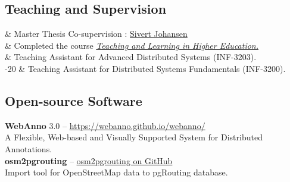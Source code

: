 \documentclass[11pt, a4paper]{article}
\newcommand{\LastName}{Sharma}
\newcommand{\Initials}{A}
\newcommand{\Me}{\textbf{\LastName, \Initials}}  %
\newcommand{\DOI}[1]{doi:\href{https://doi.org/#1}{#1}}
\newcommand{\Year}[1]{\fontsize{10pt}{0}\selectfont #1}
\begin{document}
\iffalse

\subsection*{Open Datasets}

\begin{EntriesTable}
\Year{2017}  &
    \Me, \Val.
    A gravity-derived Moho model for South America: source code, data, and
    model results from ``Fast non-linear gravity inversion in spherical
    coordinates with application to the South American Moho''.
    \DOI{10.6084/m9.figshare.3987267}
\end{EntriesTable}

\fi



\subsection*{Teaching and Supervision}

\begin{EntriesTable}
	\Year{2021} &
	Master Thesis Co-supervision : \href{https://munin.uit.no/handle/10037/25929}{Sivert Johansen} 
	\\
	\Year{2020} & 
	Completed the course \href{https://result.uit.no/phd-course/}{\textit{Teaching and Learning in Higher Education.}} 
	\\
	\Year{2020} &
	Teaching Assistant for Advanced Distributed Systems (INF-3203).
	\\
	\Year{2019-20} &
	Teaching Assistant for Distributed Systems Fundamentals (INF-3200).

\end{EntriesTable}

\subsection*{Open-source Software}
\textbf{WebAnno} 3.0 -- \href{https://webanno.github.io/webanno/}{https://webanno.github.io/webanno/}
\\
A Flexible, Web-based and Visually Supported System for Distributed Annotations.
\\
\textbf{osm2pgrouting} -- \href{https://github.com/pgRouting/osm2pgrouting/blob/main/AUTHORS.md}{osm2pgrouting on GitHub}
\\
Import tool for OpenStreetMap data to pgRouting database.

\end{document}
